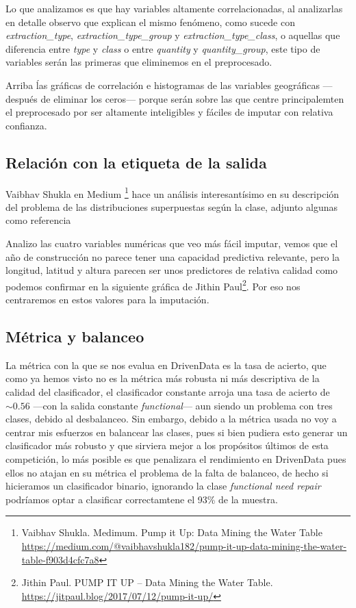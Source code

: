 \documentclass{article}
\newcommand{\img}[2]{
\noindent\makebox[\textwidth][c]{\texttt{[image: imgs/\#1]}}%
}
\begin{document}
\img{corr}{0.5}

Lo que analizamos es que hay variables altamente correlacionadas, al analizarlas en detalle observo que explican el mismo fenómeno, como sucede con \textit{extraction\_type}, \textit{extraction\_type\_group} y \textit{extraction\_type\_class}, o aquellas que diferencia entre \textit{type} y \textit{class} o entre \textit{quantity} y \textit{quantity\_group}, este tipo de variables serán las primeras que eliminemos en el preprocesado.

\img{corr2}{0.6}

Arriba ĺas gráficas de correlación e histogramas de las variables geográficas ---después de eliminar los ceros--- porque serán sobre las que centre principalemten el preprocesado por ser altamente inteligibles y fáciles de imputar con relativa confianza.

\subsection{Relación con la etiqueta de la salida}

Vaibhav Shukla en Medium \footnote{Vaibhav Shukla. Medimum. Pump it Up: Data Mining the Water Table \url{https://medium.com/@vaibhavshukla182/pump-it-up-data-mining-the-water-table-f903d4cfc7a8}} hace un análisis interesantísimo en su descripción del problema de las distribuciones superpuestas según la clase, adjunto algunas como referencia
\\

\img{geo_dist}{1.2}

Analizo las cuatro variables numéricas que veo más fácil imputar, vemos que el año de construcción no parece tener una capacidad predictiva relevante, pero la longitud, latitud y altura parecen ser unos predictores de relativa calidad como podemos confirmar en la siguiente gráfica de Jithin Paul\footnote{Jithin Paul. PUMP IT UP – Data Mining the Water Table. \url{https://jitpaul.blog/2017/07/12/pump-it-up/}}. Por eso nos centraremos en estos valores para la imputación.

\img{map_dist}{0.5}

\subsection{Métrica y balanceo}

La métrica con la que se nos evalua en DrivenData es la tasa de acierto, que como ya hemos visto no es la métrica más robusta ni más descriptiva de la calidad del clasificador, el clasificador constante arroja una tasa de acierto de $\sim 0.56$ ---con la salida constante \textit{functional}--- aun siendo un problema con tres clases, debido al desbalanceo. Sin embargo, debido a la métrica usada no voy a centrar mis esfuerzos en balancear las clases, pues si bien pudiera esto generar un clasificador más robusto y que sirviera mejor a los propósitos últimos de esta competición, lo más posible es que penalizara el rendimiento en DrivenData pues ellos no atajan en su métrica el problema de la falta de balanceo, de hecho si hicieramos un clasificador binario, ignorando la clase \textit{functional need repair} podríamos optar a clasificar correctamtene el 93\% de la muestra.
\end{document}
